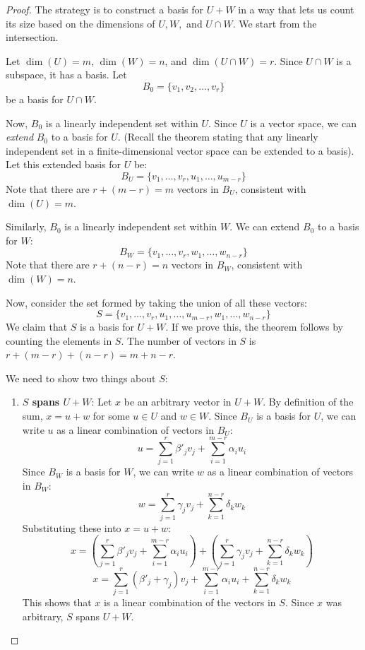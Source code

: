 \documentclass[11pt]{article}
\theoremstyle{definition}
\theoremstyle{remark}
\newcommand{\dimn}{\operatorname{dim}}
\newcommand{\intersect}{\cap}
\begin{document}
\begin{proof}
The strategy is to construct a basis for $U+W$ in a way that lets us count its size based on the dimensions of $U, W,$ and $U \intersect W$. We start from the intersection.

Let $\dimn(U) = m$, $\dimn(W) = n$, and $\dimn(U \intersect W) = r$. Since $U \intersect W$ is a subspace, it has a basis. Let
\[ B_0 = \{v_1, v_2, \dots, v_r\} \]
be a basis for $U \intersect W$.

Now, $B_0$ is a linearly independent set within $U$. Since $U$ is a vector space, we can \textit{extend} $B_0$ to a basis for $U$. (Recall the theorem stating that any linearly independent set in a finite-dimensional vector space can be extended to a basis). Let this extended basis for $U$ be:
\[ B_U = \{v_1, \dots, v_r, u_1, \dots, u_{m-r}\} \]
Note that there are $r + (m-r) = m$ vectors in $B_U$, consistent with $\dimn(U)=m$.

Similarly, $B_0$ is a linearly independent set within $W$. We can extend $B_0$ to a basis for $W$:
\[ B_W = \{v_1, \dots, v_r, w_1, \dots, w_{n-r}\} \]
Note that there are $r + (n-r) = n$ vectors in $B_W$, consistent with $\dimn(W)=n$.

Now, consider the set formed by taking the union of all these vectors:
\[ S = \{v_1, \dots, v_r, u_1, \dots, u_{m-r}, w_1, \dots, w_{n-r}\} \]
We claim that $S$ is a basis for $U+W$. If we prove this, the theorem follows by counting the elements in $S$. The number of vectors in $S$ is $r + (m-r) + (n-r) = m + n - r$.

We need to show two things about $S$:
\begin{enumerate}
    \item \textbf{$S$ spans $U+W$}: Let $x$ be an arbitrary vector in $U+W$. By definition of the sum, $x = u + w$ for some $u \in U$ and $w \in W$.
    Since $B_U$ is a basis for $U$, we can write $u$ as a linear combination of vectors in $B_U$:
    \[ u = \sum_{j=1}^r \beta'_j v_j + \sum_{i=1}^{m-r} \alpha_i u_i \]
    Since $B_W$ is a basis for $W$, we can write $w$ as a linear combination of vectors in $B_W$:
    \[ w = \sum_{j=1}^r \gamma_j v_j + \sum_{k=1}^{n-r} \delta_k w_k \]
    Substituting these into $x = u + w$:
    \[ x = \left( \sum_{j=1}^r \beta'_j v_j + \sum_{i=1}^{m-r} \alpha_i u_i \right) + \left( \sum_{j=1}^r \gamma_j v_j + \sum_{k=1}^{n-r} \delta_k w_k \right) \]
    \[ x = \sum_{j=1}^r (\beta'_j + \gamma_j) v_j + \sum_{i=1}^{m-r} \alpha_i u_i + \sum_{k=1}^{n-r} \delta_k w_k \]
    This shows that $x$ is a linear combination of the vectors in $S$. Since $x$ was arbitrary, $S$ spans $U+W$.


\end{enumerate}
\end{proof}
\end{document}

